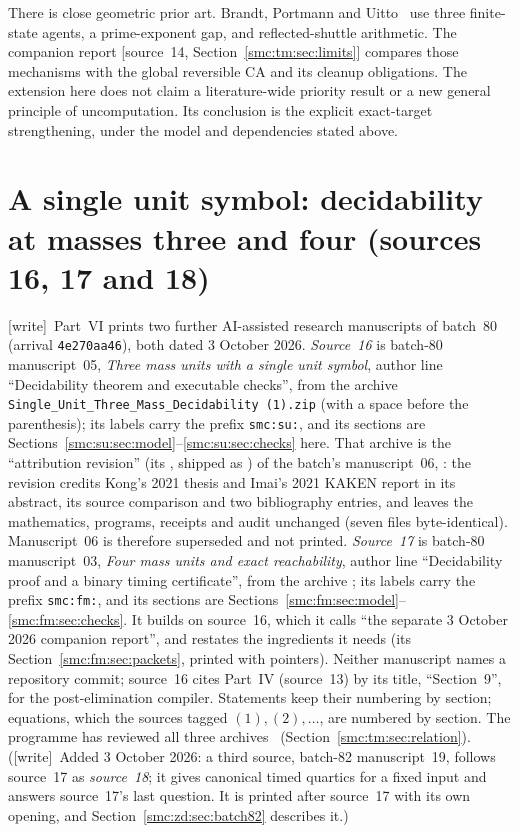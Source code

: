 \documentclass[11pt,letterpaper]{article}
\numberwithin{equation}{section}
\theoremstyle{definition}
\theoremstyle{remark}
\newcommand{\wtag}{\textup{[write]}}
\begin{document}
There is close geometric prior art. Brandt, Portmann and Uitto~\cite{brandt2020} use three finite-state agents, a prime-exponent gap, and reflected-shuttle arithmetic. The companion report \textup{[source~14, Section~\ref{smc:tm:sec:limits}]} compares those mechanisms with the global reversible CA and its cleanup obligations. The extension here does not claim a literature-wide priority result or a new general principle of uncomputation. Its conclusion is the explicit exact-target strengthening, under the model and dependencies stated above.

\part{A single unit symbol: decidability at masses three and four (sources 16, 17 and 18)}\label{smc:su:part}

\noindent\wtag\ Part~VI prints two further AI-assisted research manuscripts of batch~80 (arrival \texttt{4e270aa46}), both dated 3 October 2026. \emph{Source~16} is batch-80 manuscript~05, \emph{Three mass units with a single unit symbol}, author line ``Decidability theorem and executable checks'', from the archive \texttt{Single\_Unit\_Three\_Mass\_Decidability (1).zip} (with a space before the parenthesis); its labels carry the prefix \texttt{smc:su:}, and its sections are Sections~\ref{smc:su:sec:model}--\ref{smc:su:sec:checks} here. That archive is the ``attribution revision'' (its , shipped as ) of the batch's manuscript~06, : the revision credits Kong's 2021 thesis and Imai's 2021 KAKEN report in its abstract, its source comparison and two bibliography entries, and leaves the mathematics, programs, receipts and audit unchanged (seven files byte-identical). Manuscript~06 is therefore superseded and not printed. \emph{Source~17} is batch-80 manuscript~03, \emph{Four mass units and exact reachability}, author line ``Decidability proof and a binary timing certificate'', from the archive ; its labels carry the prefix \texttt{smc:fm:}, and its sections are Sections~\ref{smc:fm:sec:model}--\ref{smc:fm:sec:checks}. It builds on source~16, which it calls ``the separate 3 October 2026 companion report'', and restates the ingredients it needs (its Section~\ref{smc:fm:sec:packets}, printed with pointers). Neither manuscript names a repository commit; source~16 cites Part~IV (source~13) by its title, ``Section~9'', for the post-elimination compiler. Statements keep their numbering by section; equations, which the sources tagged $(1),(2),\ldots$, are numbered by section. The programme has reviewed all three archives~\cite{reviewlowmass} (Section~\ref{smc:tm:sec:relation}). (\wtag\ Added 3 October 2026: a third source, batch-82 manuscript~19, follows source~17 as \emph{source~18}; it gives canonical timed quartics for a fixed input and answers source~17's last question. It is printed after source~17 with its own opening, and Section~\ref{smc:zd:sec:batch82} describes it.)
\end{document}
